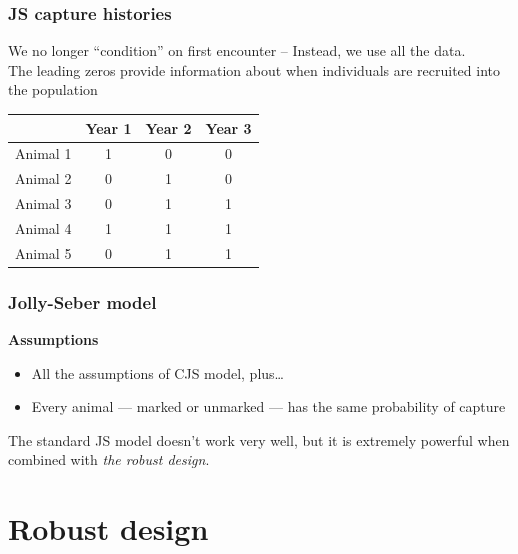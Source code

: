 \documentclass[color=usenames,dvipsnames]{beamer}\usepackage[]{graphicx}\usepackage[]{xcolor}
\begin{document}
\begin{frame}
  \frametitle{JS capture histories}
  {We no longer ``condition'' on first encounter -- Instead, we use
    all the data. \\}
  \vfill
  The leading zeros provide information about when individuals are
  recruited into the population \\
  \vfill
  \begin{center}
    \small
    \begin{tabular}{lccc}
      \hline
      & Year 1 & Year 2 & Year 3 \\
      \hline
      Animal 1 & 1 & 0 & 0 \\
      Animal 2 & 0 & 1 & 0 \\
      Animal 3 & 0 & 1 & 1 \\
      Animal 4 & 1 & 1 & 1 \\
      Animal 5 & 0 & 1 & 1 \\
      \hline
    \end{tabular}
  \end{center}
\end{frame}



\begin{frame}
  \frametitle{Jolly-Seber model}
  {\bf Assumptions}
  \begin{itemize}
    \item All the assumptions of CJS model, plus\dots
    \item Every animal --- marked or unmarked --- has the same
      probability of capture
  \end{itemize}
  \pause
  \vfill
  The standard JS model doesn't work very well, but it is extremely
  powerful when combined with \emph{the robust design}.
\end{frame}



\section{Robust design}



\end{document}
